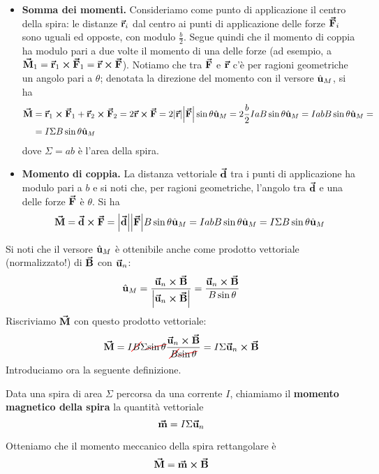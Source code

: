 \begin{itemize}
	\item \textbf{Somma dei momenti.} Consideriamo come punto di applicazione il centro della spira: le distanze $\vb*{\va{r}}_i$ dal centro ai punti di applicazione delle forze $\vb*{\va{F}}_i$ sono uguali ed opposte, con modulo $\frac{b}{2}$. Segue quindi che il momento di coppia ha modulo pari a due volte il momento di una delle forze (ad esempio, a $\vb*{\va{M}}_1=\vb*{\va{r}}_1\cross\vb*{\va{F}}_1=\vb*{\va{r}}\cross\vb*{\va{F}}$). Notiamo che tra $\vb*{\va{F}}$ e $\vb*{\va{r}}$ c'è per ragioni geometriche un angolo pari a $\theta$; denotata la direzione del momento con il versore $\hat{\mathbf{u}}_M$, si ha
	\begin{align*}
		\vb*{\va{M}}&=\vb*{\va{r}}_1\cross \vb*{\va{F}}_1+\vb*{\va{r}}_2\cross \vb*{\va{F}}_2=2\vb*{\va{r}}\cross\vb*{\va{F}}=2\abs{\vb*{\va{r}}}\abs{\vb*{\va{F}}}\sin\theta\hat{\mathbf{u}}_M=2\frac{b}{2}IaB\sin\theta\hat{\mathbf{u}}_M=Iab B \sin\theta\hat{\mathbf{u}}_M=\\
		&=I\Sigma B\sin\theta\hat{\mathbf{u}}_M
	\end{align*}
dove $\Sigma=ab$ è l'area della spira.
\item \textbf{Momento di coppia.} La distanza vettoriale $\vb*{\va{d}}$ tra i punti di applicazione ha modulo pari a $b$ e si noti che, per ragioni geometriche, l'angolo tra $\vb*{\va{d}}$ e una delle forze $\vb*{\va{F}}$ è $\theta$. Si ha
	\begin{equation*}
	\vb*{\va{M}}=\vb*{\va{d}}\cross\vb*{\va{F}}=\abs{\vb*{\va{d}}}\abs{\vb*{\va{F}}}B \sin\theta\hat{\mathbf{u}}_M=Iab B \sin\theta\hat{\mathbf{u}}_M=I\Sigma B\sin\theta\hat{\mathbf{u}}_M
\end{equation*}
\end{itemize}
Si noti che il versore $\hat{\mathbf{u}}_M$ è ottenibile anche come prodotto vettoriale (normalizzato!) di $\vb*{\va{B}}$ con $\vb*{\va{u}}_n$:
\begin{equation}
	\hat{\mathbf{u}}_M=\frac{\vb*{\va{u}}_n\cross\vb*{\va{B}}}{\abs{\vb*{\va{u}}_n\cross\vb*{\va{B}}}}=\frac{\vb*{\va{u}}_n\cross\vb*{\va{B}}}{B\sin\theta}
\end{equation}
Riscriviamo $\vb*{\va{M}}$ con questo prodotto vettoriale:
\begin{equation*}
	\vba{M}=I\Ccancel[red]{B}\Sigma\Ccancel[red]{\sin\theta}\frac{\vba{u}_n\cross\vba{B}}{\Ccancel[red]{B}\Ccancel[red]{\sin\theta}}=I\Sigma\vba{u}_n\cross\vba{B}
\end{equation*}
Introduciamo ora la seguente definizione.
\begin{define}
	Data una spira di area $\Sigma$ percorsa da una corrente $I$, chiamiamo il \textbf{momento magnetico della spira} la quantità vettoriale
	\begin{equation}
		\vb*{\va{m}}=I\Sigma\vb*{\va{u}}_n
	\end{equation}
\end{define}
Otteniamo che il momento meccanico della spira rettangolare è
\begin{equation}
	\vb*{\va{M}}=\vb*{\va{m}}\cross\vb*{\va{B}}
\end{equation}
